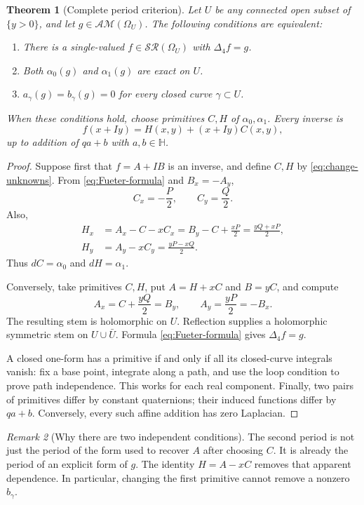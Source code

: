 \documentclass[11pt,a4paper]{article}
\numberwithin{equation}{section}
\newtheorem{theorem}{Theorem}[section]
\theoremstyle{definition}
\theoremstyle{remark}
\newtheorem{remark}[theorem]{Remark}
\newcommand{\HH}{\mathbb H}
\newcommand{\SR}{\mathcal{SR}}
\newcommand{\AM}{\mathcal{AM}}
\newcommand{\lap}{\Delta_4}
\begin{document}
\begin{theorem}[Complete period criterion]\label{thm:global}
Let $U$ be any connected open subset of $\{y>0\}$, and let
$g\in\AM(\Omega_U)$. The following conditions are equivalent:
\begin{enumerate}[label=\textup{(\roman*)}]
\item There is a single-valued $f\in\SR(\Omega_U)$ with $\lap f=g$.
\item Both $\alpha_0(g)$ and $\alpha_1(g)$ are exact on $U$.
\item $a_\gamma(g)=b_\gamma(g)=0$ for every closed curve $\gamma\subset U$.
\end{enumerate}
When these conditions hold, choose primitives $C,H$ of $\alpha_0,\alpha_1$.
Every inverse is
\begin{equation}\label{eq:global-inverse}
 f(x+Iy)=H(x,y)+(x+Iy)C(x,y),
\end{equation}
up to addition of $qa+b$ with $a,b\in\HH$.
\end{theorem}
\begin{proof}
Suppose first that $f=A+IB$ is an inverse, and define $C,H$ by
\eqref{eq:change-unknowns}. From \eqref{eq:Fueter-formula} and
$B_x=-A_y$,
\[
 C_x=-\frac P2,\qquad C_y=\frac Q2.
\]
Also,
\begin{align*}
 H_x&=A_x-C-xC_x=B_y-C+\frac{xP}{2}
       =\frac{yQ+xP}{2},\\
 H_y&=A_y-xC_y=\frac{yP-xQ}{2}.
\end{align*}
Thus $dC=\alpha_0$ and $dH=\alpha_1$.

Conversely, take primitives $C,H$, put $A=H+xC$ and $B=yC$, and compute
\[
 A_x=C+\frac{yQ}{2}=B_y,\qquad
 A_y=\frac{yP}{2}=-B_x.
\]
The resulting stem is holomorphic on $U$. Reflection supplies a holomorphic
symmetric stem on $U\cup\bar U$. Formula \eqref{eq:Fueter-formula} gives
$\lap f=g$.

A closed one-form has a primitive if and only if all its closed-curve integrals
vanish: fix a base point, integrate along a path, and use the loop condition
to prove path independence. This works for each real component. Finally, two
pairs of primitives differ by constant quaternions; their induced functions
differ by $qa+b$. Conversely, every such affine addition has zero Laplacian.
\end{proof}

\begin{remark}[Why there are two independent conditions]
The second period is not just the period of the form used to recover $A$ after
choosing $C$. It is already the period of an explicit form of $g$. The identity
$H=A-xC$ removes that apparent dependence. In particular, changing the first
primitive cannot remove a nonzero $b_\gamma$.
\end{remark}
\end{document}
